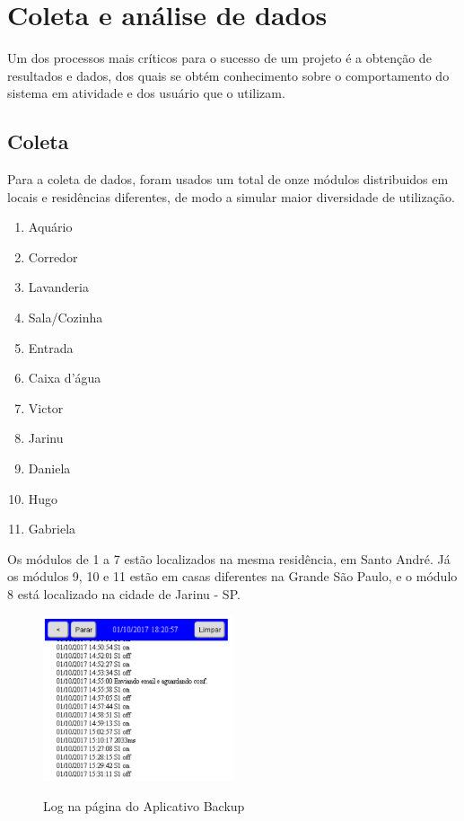\chapter{Coleta e análise de dados}

Um dos processos mais críticos para o sucesso de um projeto é a obtenção de resultados e dados, dos quais se obtém conhecimento sobre o comportamento do sistema em atividade e dos usuário que o utilizam.

\section{Coleta}

Para a coleta de dados, foram usados um total de onze módulos distribuidos em locais e residências diferentes, de modo a simular maior diversidade de utilização.

\begin{enumerate}
	\item Aquário
	\item Corredor
	\item Lavanderia
	\item Sala/Cozinha
	\item Entrada
	\item Caixa d’água
	\item Victor
	\item Jarinu
	\item Daniela
	\item Hugo
	\item Gabriela
\end{enumerate}

Os módulos de 1 a 7 estão localizados na mesma residência, em Santo André. Já os módulos 9, 10 e 11 estão em casas diferentes na Grande São Paulo, e o módulo 8 está localizado na cidade de Jarinu - SP.

\begin{figure}[H]
	\centering
	\caption{Log na página do Aplicativo Backup}
	\includegraphics[width=0.5\textwidth]{logAppBackup}
	\label{fig:logAppBackup}
\end{figure}

